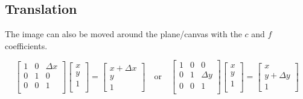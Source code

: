 \documentclass{article}
\begin{document}
\begin{figure}[!htbp]
    \centering
\end{figure}

\subsection{Translation} 

The image can also be moved around the plane/canvas with the $ c $ and $ f $
coefficients.

\[%
    \begin{bmatrix} 
        1 & 0 & \Delta {x} \\
		0 & 1 & 0 \\
		0 & 0 & 1 \\		
    \end{bmatrix}
    \begin{bmatrix}
        x \\
        y \\
		1 \\		
    \end{bmatrix}
    =
    \begin{bmatrix} x + \Delta {x} \\  y \\ 1 \end{bmatrix}
    \quad
    \text{or}
    \quad
    \begin{bmatrix} 
        1 & 0 & 0 \\
		0 & 1 & \Delta {y} \\
		0 & 0 & 1 \\		
    \end{bmatrix}
    \begin{bmatrix}
        x \\
        y \\
		1 \\		
    \end{bmatrix}
    =
    \begin{bmatrix} x \\ y + \Delta {y} \\ 1 \end{bmatrix}
\]%

\begin{figure}[!htbp]
    \centering
\end{figure}
\end{document}
